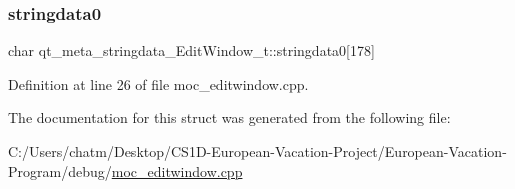 \mbox{\label{structqt__meta__stringdata___edit_window__t_a3caab11840408e6a615abccc971eaf49}} 
\subsubsection{\texorpdfstring{stringdata0}{stringdata0}}
{\footnotesize\ttfamily char qt\+\_\+meta\+\_\+stringdata\+\_\+\+Edit\+Window\+\_\+t\+::stringdata0\mbox{[}178\mbox{]}}



Definition at line 26 of file moc\+\_\+editwindow.\+cpp.



The documentation for this struct was generated from the following file\+:\begin{DoxyCompactItemize}
\item 
C\+:/\+Users/chatm/\+Desktop/\+C\+S1\+D-\/\+European-\/\+Vacation-\/\+Project/\+European-\/\+Vacation-\/\+Program/debug/\mbox{\hyperlink{moc__editwindow_8cpp}{moc\+\_\+editwindow.\+cpp}}\end{DoxyCompactItemize}
